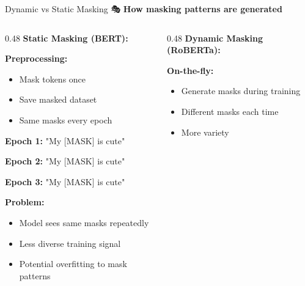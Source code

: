 \documentclass[aspectratio=169]{beamer}
\begin{document}
\begin{frame}[shrink=10]{Dynamic vs Static Masking 🎭}
\textbf{How masking patterns are generated}

\vspace{1em}

\begin{columns}[T]
\begin{column}{0.48\textwidth}
\textbf{Static Masking (BERT):}

\vspace{0.5em}

\textbf{Preprocessing:}
\begin{itemize}\setlength{\itemsep}{0pt}
    \item Mask tokens once
    \item Save masked dataset
    \item Same masks every epoch
\end{itemize}

\vspace{0.5em}

\textbf{Epoch 1:} "My [MASK] is cute"

\textbf{Epoch 2:} "My [MASK] is cute"

\textbf{Epoch 3:} "My [MASK] is cute"

\vspace{0.5em}

\textbf{Problem:}
\begin{itemize}\setlength{\itemsep}{0pt}
    \item Model sees same masks repeatedly
    \item Less diverse training signal
    \item Potential overfitting to mask patterns
\end{itemize}
\end{column}

\begin{column}{0.48\textwidth}
\textbf{Dynamic Masking (RoBERTa):}

\vspace{0.5em}

\textbf{On-the-fly:}
\begin{itemize}\setlength{\itemsep}{0pt}
    \item Generate masks during training
    \item Different masks each time
    \item More variety
\end{itemize}


\end{column}
\end{columns}
\end{frame}
\end{document}

